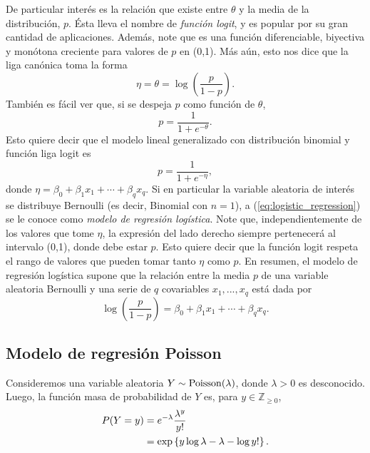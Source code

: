 De particular interés es la relación que existe entre $\theta$ y la media de la distribución, $p$. Ésta lleva el nombre de \textit{función logit}, y es popular por su gran cantidad de aplicaciones. Además, note que es una función diferenciable, biyectiva y monótona creciente para valores de $p$ en (0,1). Más aún, esto nos dice que la liga canónica toma la forma
\begin{equation*}
	\eta = \theta = \log \left( \frac{p}{1-p} \right).
\end{equation*}
También es fácil ver que, si se despeja $p$ como función de $\theta$,
\begin{equation*}
	p = \frac{1}{1 + e^{-\theta}}.
\end{equation*}
Esto quiere decir que el modelo lineal generalizado con distribución binomial y función liga logit es
\begin{equation} \label{eq:logistic_regression}
	p = \frac{1}{1 + e^{-\eta}},
\end{equation}
donde $\eta = \beta_0 + \beta_1 x_1 + \cdots + \beta_q x_q$. Si en particular la variable aleatoria de interés se distribuye Bernoulli (es decir, Binomial con $n=1$), a (\ref{eq:logistic_regression}) se le conoce como \textit{modelo de regresión logística}. Note que, independientemente de los valores que tome $\eta$, la expresión del lado derecho siempre pertenecerá al intervalo (0,1), donde debe estar $p$. Esto quiere decir que la función logit respeta el rango de valores que pueden tomar tanto $\eta$ como $p$. En resumen, el modelo de regresión logística supone que la relación entre la media $p$ de una variable aleatoria Bernoulli y una serie de $q$ covariables $x_1, ..., x_q$ está dada por
\begin{equation}
	\log \left( \frac{p}{1-p} \right) = \beta_0 + \beta_1 x_1 + \cdots + \beta_q x_q.
\end{equation}





\subsection{Modelo de regresión Poisson}


Consideremos una variable aleatoria $Y \sim \mathrm{Poisson} (\lambda)$, donde $\lambda > 0$ es desconocido. Luego, la función masa de probabilidad de $Y$ es, para $y \in \mathbb{Z}_{\geq 0}$,
\begin{align*}
	P(Y = y) &= e^{-\lambda} \frac{\lambda^y}{y!} \\
             &= \mathrm{exp} \left\{ y \log \lambda - \lambda - \log y! \right\}.
\end{align*}

